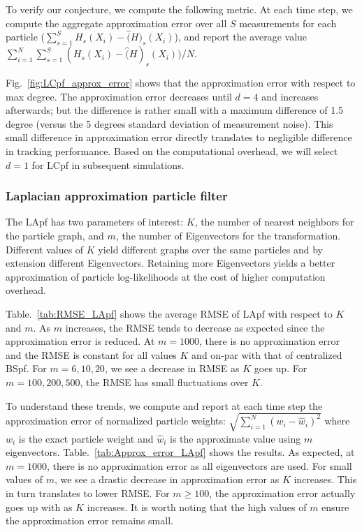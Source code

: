 \documentclass[10pt,letterpaper,final]{article}
\begin{document}
To verify our conjecture, we compute the following metric. At each time step, we compute the aggregate approximation error over all $S$ measurements for each particle ($\sum_{s=1}^S H_s(X_i)-\hat(H)_s(X_i)$), and report the average value $\sum_{i=1}^N \sum_{s=1}^S(H_s(X_i)-\hat(H)_s(X_i))/N$. 

Fig.~\ref{fig:LCpf_approx_error} shows that the approximation error with respect to max degree. The approximation error decreases until $d=4$ and increases afterwards; but the difference is rather small with a maximum difference of 1.5 degree (versus the 5 degrees standard deviation of measurement noise). This small difference in approximation error directly translates to negligible difference in tracking performance. Based on the computational overhead, we will select $d=1$ for LCpf in subsequent simulations. 

\subsubsection{Laplacian approximation particle filter}
The LApf has two parameters of interest: $K$, the number of nearest neighbors for the particle graph, and $m$, the number of Eigenvectors for the transformation. Different values of $K$ yield different graphs over the same particles and by extension different Eigenvectors. Retaining more Eigenvectors yields a better approximation of particle log-likelihoods at the cost of higher computation overhead. 

Table.~\ref{tab:RMSE_LApf} shows the average RMSE of LApf with respect to $K$ and $m$. As $m$ increases, the RMSE tends to decrease as expected since the approximation error is reduced.   At $m=1000$, there is no approximation error and the RMSE is constant for all values $K$ and on-par with that of centralized BSpf. For $m=6, 10, 20$, we see a decrease in RMSE as $K$ goes up.  For $m= 100, 200, 500$, the RMSE has small fluctuations over $K$. 

To understand these trends, we compute and report at each time step the approximation error of normalized particle weights: $\sqrt{\sum_{i=1}^N (w_i-\hat{w}_i)^2}$ where $w_i$ is the exact particle weight and $\hat{w}_i$ is the approximate value using $m$ eigenvectors. Table.~\ref{tab:Approx_error_LApf} shows the results. As expected, at $m=1000$, there is no approximation error as all eigenvectors are used. For small values of $m$, we see a drastic decrease in approximation error as $K$ increases. This in turn translates to lower RMSE. For $m\geq 100$, the approximation error actually goes up with as $K$ increases. It is worth noting that the high values of $m$ ensure the approximation error remains small. 
\end{document}
